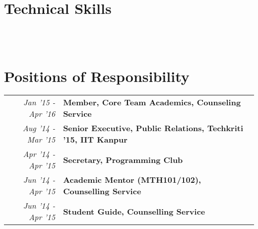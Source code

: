 \documentclass[a4paper]{norm-resume}
\begin{document}

\section{Technical Skills \hrulefill}

\vspace{1mm}	%

 \hfill {} \\
\vspace{1mm}	%
 \hfill {} \\
\vspace{1mm}	%
 \hfill {}

\vspace{1mm}	%


\section{Positions of Responsibility \hrulefill}

\vspace{2mm} %
		
	\begin{tabular}{r|p{16cm}}	

	\null \hspace{10mm} \normalsize\emph{Jan '15 - Apr '16} & \textbf{Member, Core Team Academics, Counseling Service}\\

	\normalsize\emph{Aug '14 - Mar '15} & \textbf{Senior Executive, Public Relations, Techkriti '15, IIT Kanpur}\\

	\normalsize\emph{Apr '14 - Apr '15} & \normalsize\textbf{Secretary, Programming Club}\\

	\normalsize\emph{Jun '14 - Apr '15} & \normalsize\textbf{Academic Mentor (MTH101/102), Counselling Service}\\ 

	\normalsize\emph{Jun '14 - Apr '15} & \normalsize\textbf{Student Guide, Counselling Service}\\

	\end{tabular}
\end{document}

